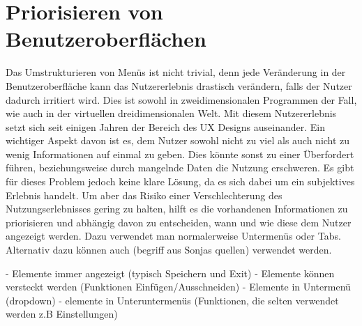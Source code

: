 	\section{Priorisieren von Benutzeroberflächen}
		Das Umstrukturieren von Menüs ist nicht trivial, denn jede Veränderung in der Benutzeroberfläche kann das Nutzererlebnis drastisch verändern, falls der Nutzer dadurch irritiert wird. Dies ist sowohl in zweidimensionalen Programmen der Fall, wie auch in der virtuellen dreidimensionalen Welt.
		Mit diesem Nutzererlebnis setzt sich seit einigen Jahren der Bereich des UX Designs auseinander. 
		Ein wichtiger Aspekt davon ist es, dem Nutzer sowohl nicht zu viel als auch nicht zu wenig Informationen auf einmal zu geben. Dies könnte sonst zu einer Überfordert führen, beziehungsweise durch mangelnde Daten die Nutzung erschweren.
		Es gibt für dieses Problem jedoch keine klare Lösung, da es sich dabei um ein subjektives Erlebnis handelt.
		Um aber das Risiko einer Verschlechterung des Nutzungserlebnisses gering zu halten, hilft es die vorhandenen Informationen zu priorisieren und abhängig davon zu entscheiden, wann und wie diese dem Nutzer angezeigt werden. Dazu verwendet man normalerweise Untermenüs oder Tabs. Alternativ dazu können auch (begriff aus Sonjas quellen) verwendet werden.
		
		- Elemente immer angezeigt (typisch Speichern und Exit)
		- Elemente können versteckt werden (Funktionen Einfügen/Ausschneiden)
		- Elemente in Untermenü (dropdown)
		- elemente in Unteruntermenüs (Funktionen, die selten verwendet werden z.B Einstellungen)
		
		
